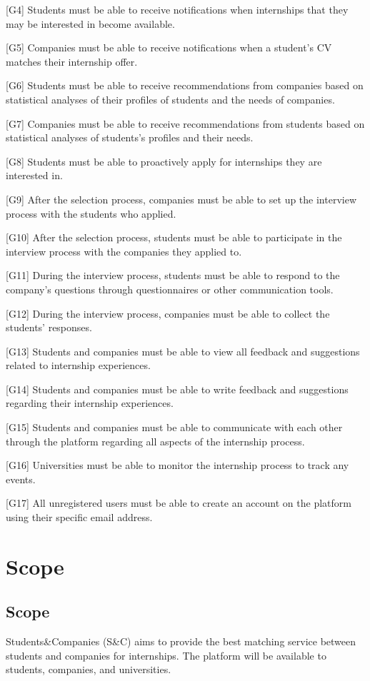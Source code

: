[G4] Students must be able to receive notifications when internships that they may be interested in become available.

[G5] Companies must be able to receive notifications when a student's CV matches their internship offer.

[G6] Students must be able to receive recommendations from companies based on statistical analyses of their profiles of students and the needs of companies.

[G7] Companies must be able to receive recommendations from students based on statistical analyses of students's profiles and their needs.

[G8] Students must be able to proactively apply for internships they are interested in.

[G9] After the selection process, companies must be able to set up the interview process with the students who applied.

[G10] After the selection process, students must be able to participate in the interview process with the companies they applied to.

[G11] During the interview process, students must be able to respond to the company's questions through questionnaires or other communication tools.

[G12] During the interview process, companies must be able to collect the students' responses.

[G13] Students and companies must be able to view all feedback and suggestions related to internship experiences.

[G14] Students and companies must be able to write feedback and suggestions regarding their internship experiences.

[G15] Students and companies must be able to communicate with each other through the platform regarding all aspects of the internship process.

[G16] Universities must be able to monitor the internship process to track any events.

[G17] All unregistered users must be able to create an account on the platform using their specific email address.

\newpage
\section{Scope}
\label{sec:Scope}
\subsection{Scope}
Students\&Companies (S\&C) aims to provide the best matching service between students and companies for internships. The platform will be available
to students, companies, and universities.

